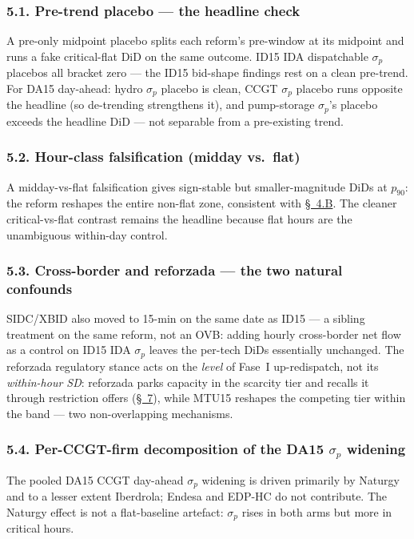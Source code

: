 \documentclass[11pt]{article}
\begin{document}
\subsubsection*{5.1. Pre-trend placebo --- the headline check}\label{sec:5b}
A pre-only midpoint placebo splits each reform's pre-window at its midpoint and runs a fake critical-flat DiD on the same outcome. ID15 IDA dispatchable $\sigma_p$ placebos all bracket zero --- the ID15 bid-shape findings rest on a clean pre-trend. For DA15 day-ahead: hydro $\sigma_p$ placebo is clean, CCGT $\sigma_p$ placebo runs opposite the headline (so de-trending strengthens it), and pump-storage $\sigma_p$'s placebo exceeds the headline DiD --- not separable from a pre-existing trend.

\subsubsection*{5.2. Hour-class falsification (midday vs.\ flat)}\label{sec:5a}
A midday-vs-flat falsification gives sign-stable but smaller-magnitude DiDs at $p_{90}$: the reform reshapes the entire non-flat zone, consistent with \hyperref[sec:4-specB]{\S~4.B}. The cleaner critical-vs-flat contrast remains the headline because flat hours are the unambiguous within-day control.

\subsubsection*{5.3. Cross-border and reforzada --- the two natural confounds}\label{sec:5c}\label{sec:5d}
SIDC/XBID also moved to 15-min on the same date as ID15 --- a sibling treatment on the same reform, not an OVB: adding hourly cross-border net flow as a control on ID15 IDA $\sigma_p$ leaves the per-tech DiDs essentially unchanged. The reforzada regulatory stance acts on the \emph{level} of Fase~I up-redispatch, not its \emph{within-hour SD}: reforzada parks capacity in the scarcity tier and recalls it through restriction offers (\hyperref[sec:context]{\S~7}), while MTU15 reshapes the competing tier within the band --- two non-overlapping mechanisms.

\subsubsection*{5.4. Per-CCGT-firm decomposition of the DA15 $\sigma_p$ widening}
The pooled DA15 CCGT day-ahead $\sigma_p$ widening is driven primarily by Naturgy and to a lesser extent Iberdrola; Endesa and EDP-HC do not contribute. The Naturgy effect is not a flat-baseline artefact: $\sigma_p$ rises in both arms but more in critical hours.
\end{document}
